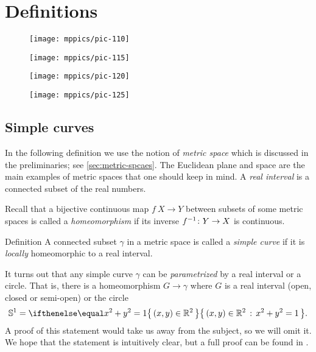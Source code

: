 \chapter{Definitions}


\begin{figure}[h!]
\begin{minipage}{.48\textwidth}
\centering
\texttt{[image: mppics/pic-110]}
\end{minipage}\hfill
\begin{minipage}{.48\textwidth}
\centering
\texttt{[image: mppics/pic-115]}
\end{minipage}
\bigskip
\begin{minipage}{.48\textwidth}
\centering
\texttt{[image: mppics/pic-120]}
\end{minipage}\hfill
\begin{minipage}{.48\textwidth}
\centering
\texttt{[image: mppics/pic-125]}
\end{minipage}
\end{figure}

\section{Simple curves}

In the following definition we use the notion of {}\emph{metric space} which is discussed in the preliminaries; see \ref{sec:metric-spcaes}.
The Euclidean plane and space are the main examples of metric spaces that one should keep in mind. A {}\emph{real interval} is a connected subset of the real numbers.

Recall that a bijective continuous map $f\:X\to Y$ between subsets of some metric spaces is called a {}\emph{homeomorphism} if its inverse $f^{-1}\:Y\z\to X$ is continuous.  

\begin{thm}{Definition} 
A connected subset $\gamma$ in a metric space is called a \emph{simple curve} if it is {}\emph{locally} homeomorphic to a real interval.
\end{thm}

It turns out that any simple curve $\gamma$ can be \emph{parametrized} by a real interval or a circle.
That is, there is a homeomorphism $G\to\gamma$ 
where $G$ is a real interval (open, closed or semi-open) or the circle
\[\mathbb{S}^1=\set{(x,y)\in\RR^2}{x^2+y^2=1}.\]
A proof of this statement would take us away from the subject, so we will omit it. We hope that the statement is intuitively clear, but a full proof can be found in . %

